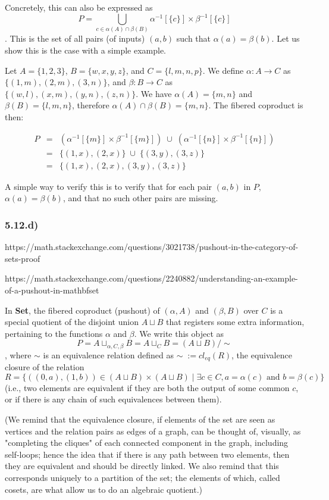 Concretely, this can also be expressed as $$P = \bigcup_{c \in \alpha(A) \cap \beta(B)} \alpha^{-1}[\{c\}] \times \beta^{-1}[\{c\}]$$. This is the set of all pairs (of inputs) $(a,b)$ such that $\alpha(a) = \beta(b)$. Let us show this is the case with a simple example.

Let $A = \{1,2,3\}$, $B = \{w, x, y, z\}$, and $C = \{l, m, n, p\}$. We define $\alpha : A \to C$ as $\{(1, m), (2, m), (3, n) \}$, and $\beta : B \to C$ as $\{ (w, l), (x, m), (y, n), (z, n) \}$. We have $\alpha(A) = \{m,n\}$ and $\beta(B) = \{l, m, n\}$, therefore $\alpha(A) \cap \beta(B) = \{m,n\}$. The fibered coproduct is then:

$$
\begin{array}{lll}
P &=& (\alpha^{-1}[\{m\}] \times \beta^{-1}[\{m\}]) \; \cup \; (\alpha^{-1}[\{n\}] \times \beta^{-1}[\{n\}]) \\
  &=& \{ (1,x), (2,x) \} \; \cup \; \{ (3,y), (3,z) \} \\
  &=& \{ (1,x), (2,x), (3,y), (3,z) \}
\end{array}
$$

A simple way to verify this is to verify that for each pair $(a,b)$ in $P$, $\alpha(a) = \beta(b)$, and that no such other pairs are missing.


\subsubsection*{5.12.d)}

https://math.stackexchange.com/questions/3021738/pushout-in-the-category-of-sets-proof

https://math.stackexchange.com/questions/2240882/understanding-an-example-of-a-pushout-in-mathbfset

In \textbf{Set}, the fibered coproduct (pushout) of $(\alpha, A)$ and $(\beta, B)$ over $C$ is a special quotient of the disjoint union $A \sqcup B$ that registers some extra information, pertaining to the functions $\alpha$ and $\beta$. We write this object as $$P = A \sqcup_{\alpha, C, \beta} B = A \sqcup_C B = (A \sqcup B) / \sim$$, where $\sim$ is an equivalence relation defined as  $\sim \; := cl_{eq}(R)$, the equivalence closure of the relation $$R = \{((0, a), (1, b)) \in (A \sqcup B) \times (A \sqcup B) \mid \exists c \in C, a = \alpha(c) \text{ and } b = \beta(c) \}$$ (i.e., two elements are equivalent if they are both the output of some common $c$, or if there is any chain of such equivalences between them).

(We remind that the equivalence closure, if elements of the set are seen as vertices and the relation pairs as edges of a graph, can be thought of, visually, as "completing the cliques" of each connected component in the graph, including self-loops; hence the idea that if there is any path between two elements, then they are equivalent and should be directly linked. We also remind that this corresponds uniquely to a partition of the set; the elements of which, called cosets, are what allow us to do an algebraic quotient.)

